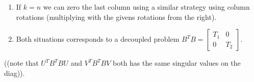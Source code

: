 \documentclass[a4paper,8pt]{beamer} %
\newcommand{\smatrix}[1]{\left[\begin{matrix} #1 \end{matrix}\right]}
\begin{document}
\begin{frame}
\begin{itemize}
\begin{enumerate}
\begin{footnotesize}
\begin{align}
{							0 & -s & 0 & c & 0   \\
							0 & 0 & 0 & 0 & 1  \\
						}
						\smatrix
						{
							\times 	& \times & 0 & 0 & 0   \\
							0 	& 0 & 0 & + & 0   \\
							0 	& 0 & \times & \times & 0    \\
							0 & 0 & 0 & \times & \times   \\
							0 & 0 & 0 & 0 & \times  \\
						}
						=
						\smatrix
						{
							\times 	& \times & 0 & 0 & 0   \\
							0 	& 0 & 0 & 0 & +   \\
							0 	& 0 & \times & \times & 0    \\
							0 & 0 & 0 & \times & \times   \\
							0 & 0 & 0 & 0 & \times  \\
						}\\
						&\smatrix
						{
							1 & 0 & 0 & 0 & 0   \\
							0 & c & 0 & 0 & s   \\
							0 & 0 & 1 & 0 & 0    \\
							0 & 0 & 0 & 1 & 0   \\
							0 & -s & 0 & 0 & c  \\
						}
						\smatrix
						{
							\times 	& \times & 0 & 0 & 0   \\
							0 	& 0 & 0 & 0 & +   \\
							0 	& 0 & \times & \times & 0    \\
							0 & 0 & 0 & \times & \times   \\
							0 & 0 & 0 & 0 & \times  \\
						}
						=
						\smatrix
						{
							\times 	& \times & 0 & 0 & 0   \\
							0 	& 0 & 0 & 0 & 0   \\
							0 	& 0 & \times & \times & 0    \\
							0 & 0 & 0 & \times & \times   \\
							0 & 0 & 0 & 0 & \times  \\
						}
				\end{align}
				This situation corresponds to a degeneracy in the eigenvalues since $B^TB$ in this case have
				a $2\times 2$ block with equal elements in the upper left block of $B^TB$.
				\end{footnotesize}
			\item If $k=n$ we can zero the last column using a similar strategy using column rotations (multiplying with the givens rotations from the right).
				\item Both situations corresponds to a decoupled problem $B^TB=\smatrix{T_1&0 \\ 0&T_2}$.
		\end{enumerate}
\end{itemize}
\begin{Tiny}
	((note that $U^TB^TBU$ and $V^TB^TBV$ both has the same singular values on the diag)).
\end{Tiny}
\end{frame}%
\end{document}
